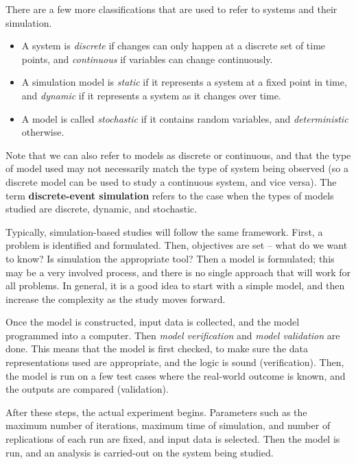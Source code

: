 There are a few more classifications that are used to refer to systems and their simulation.

\begin{itemize}
	\item A system is \emph{discrete} if changes can only happen at a discrete set of time points, and \emph{continuous} if variables can change continuously.
	\item A simulation model is \emph{static} if it represents a system at a fixed point in time, and \emph{dynamic} if it represents a system as it changes over time.
	\item A model is called \emph{stochastic} if it contains random variables, and \emph{deterministic} otherwise.
\end{itemize}

Note that we can also refer to models as discrete or continuous, and that the type of model used may not necessarily match the type of system being observed (so a discrete model can be used to study a continuous system, and vice versa).
The term \textbf{discrete-event simulation} refers to the case when the types of models studied are discrete, dynamic, and stochastic.

Typically, simulation-based studies will follow the same framework.
First, a problem is identified and formulated.
Then, objectives are set -- what do we want to know?
Is simulation the appropriate tool?
Then a model is formulated; this may be a very involved process, and there is no single approach that will work for all problems.
In general, it is a good idea to start with a simple model, and then increase the complexity as the study moves forward.

Once the model is constructed, input data is collected, and the model programmed into a computer.
Then \emph{model verification} and \emph{model validation} are done.
This means that the model is first checked, to make sure the data representations used are appropriate, and the logic is sound (verification).
Then, the model is run on a few test cases where the real-world outcome is known, and the outputs are compared (validation).

After these steps, the actual experiment begins.
Parameters such as the maximum number of iterations, maximum time of simulation, and number of replications of each run are fixed, and input data is selected.
Then the model is run, and an analysis is carried-out on the system being studied.


\newpage

